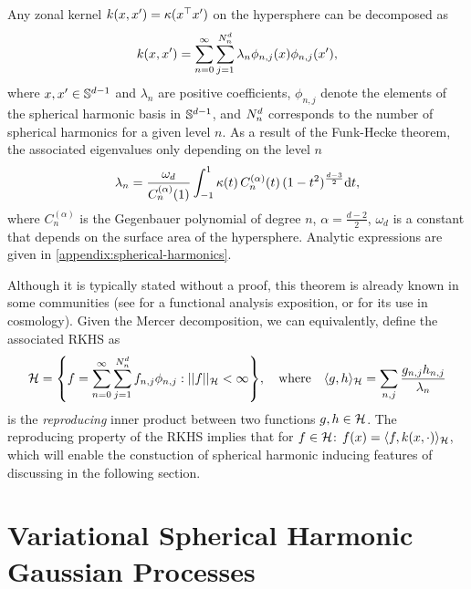 \begin{theorem}
Any zonal kernel $k(x, x') = \kappa(x^{\top} x')$ on the hypersphere can be decomposed as
\begin{equation}
\label{eq:kernel-form}
    k(x, x') = \sum_{n=0}^{\infty} \sum_{j=1}^{N^d_n} \lambda_{n} \phi_{n,j}(x) \phi_{n,j}(x'),
\end{equation}
where $x,x' \in \mathbb{S}^{d-1}$ and $\lambda_{n}$ are positive coefficients, $\phi_{n,j}$ denote the elements of the spherical harmonic basis in $\mathbb{S}^{d-1}$, and $N^d_n$ corresponds to the number of spherical harmonics for a given level $n$. As a result of the Funk-Hecke theorem, the associated eigenvalues only depending on the level $n$
\begin{equation}
    \label{eq:compute-eigenvalues}
        \lambda_{n} = \frac{\omega_{d}}{C_n^{(\alpha)}(1)} \int_{-1}^1 \kappa(t)\,C_n^{(\alpha)}(t)\,(1 - t^2)^{\frac{d-3}{2}} \mathrm{d}{t},
\end{equation} 
where $C_n^{(\alpha)}$ is the Gegenbauer polynomial of degree $n$, $\alpha = \frac{d-2}{2}$, $\omega_d$ is a constant that depends on the surface area of the hypersphere. Analytic expressions are given in \cref{appendix:spherical-harmonics}.
\end{theorem}
Although it is typically stated without a proof, this theorem is already known in some communities (see \citet{wendland2005} for a functional analysis exposition, or \citet{peacock1999cosmological} for its use in cosmology). Given the Mercer decomposition, we can equivalently, define the associated RKHS as
\begin{equation}
    \label{eq:inner-product-rkhs}
    \rkhs = \left\{
    f = 
    \sum_{n=0}^\infty \sum_{j=1}^{\dnumharmonicsforlevel} {f}_{n,j} \sh_{n, j}:
    \norm{f}_{\rkhs} < \infty
    \right\},
    \quad\text{where}\quad
    \langle g, h \rangle_{\rkhs} = 
    \sum_{n,j}
            \frac{{g}_{n, j} {h}_{n, j}}{\lambda_{n}}
\end{equation}
is the \emph{reproducing} inner product between two functions $g,h \in {\mathcal{H}}$. The reproducing property of the RKHS implies that for $f \in {\mathcal{H}}$: $f(x) = \langle f, k(x, \cdot) \rangle_{{\mathcal{H}}}$, which will enable the constuction of spherical harmonic inducing features of discussing in the following section.

\section{Variational Spherical Harmonic Gaussian Processes}
\label{sec:vish}

